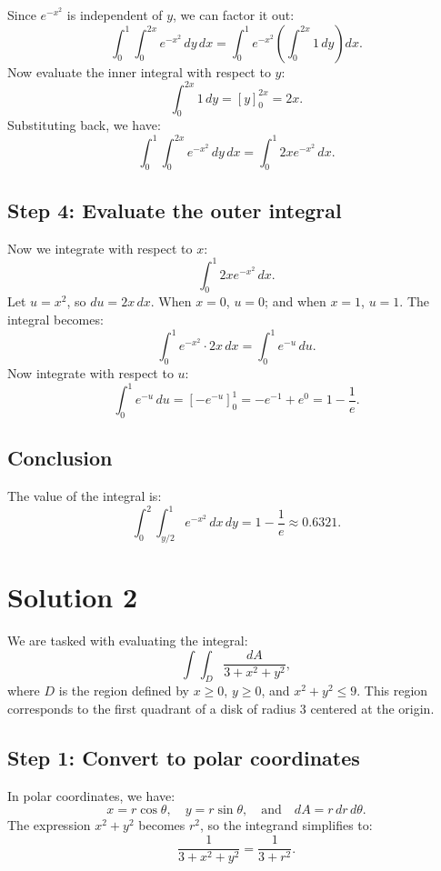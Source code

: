 \documentclass[11pt]{article}
\begin{document}
Since \( e^{-x^{2}} \) is independent of \( y \), we can factor it out:
\[
\int_{0}^{1} \int_{0}^{2x} e^{-x^{2}} \, dy \, dx = \int_{0}^{1} e^{-x^{2}} \left( \int_{0}^{2x} 1 \, dy \right) dx.
\]
Now evaluate the inner integral with respect to \( y \):
\[
\int_{0}^{2x} 1 \, dy = [y]_{0}^{2x} = 2x.
\]
Substituting back, we have:
\[
\int_{0}^{1} \int_{0}^{2x} e^{-x^{2}} \, dy \, dx = \int_{0}^{1} 2x e^{-x^{2}} \, dx.
\]
\newpage

\subsection{Step 4: Evaluate the outer integral}

Now we integrate with respect to \( x \):
\[
\int_{0}^{1} 2x e^{-x^{2}} \, dx.
\]
Let \( u = x^{2} \), so \( du = 2x \, dx \). When \( x = 0 \), \( u = 0 \); and when \( x = 1 \), \( u = 1 \). The integral becomes:
\[
\int_{0}^{1} e^{-x^{2}} \cdot 2x \, dx = \int_{0}^{1} e^{-u} \, du.
\]
Now integrate with respect to \( u \):
\[
\int_{0}^{1} e^{-u} \, du = [-e^{-u}]_{0}^{1} = -e^{-1} + e^{0} = 1 - \frac{1}{e}.
\]
\newpage

\subsection{Conclusion}

The value of the integral is:
\[
\int_{0}^{2} \int_{y/2}^{1} e^{-x^{2}} \, dx \, dy = 1 - \frac{1}{e} \approx 0.6321.
\]


\newpage
\section{Solution 2}
We are tasked with evaluating the integral:
\[
\int \int_{D} \frac{dA}{3 + x^2 + y^2},
\]
where \( D \) is the region defined by \( x \geq 0 \), \( y \geq 0 \), and \( x^2 + y^2 \leq 9 \). This region corresponds to the first quadrant of a disk of radius 3 centered at the origin.
\newpage

\subsection{Step 1: Convert to polar coordinates}

In polar coordinates, we have:
\[
x = r \cos \theta, \quad y = r \sin \theta, \quad \text{and} \quad dA = r \, dr \, d\theta.
\]
The expression \( x^2 + y^2 \) becomes \( r^2 \), so the integrand simplifies to:
\[
\frac{1}{3 + x^2 + y^2} = \frac{1}{3 + r^2}.
\]
\newpage
\end{document}
